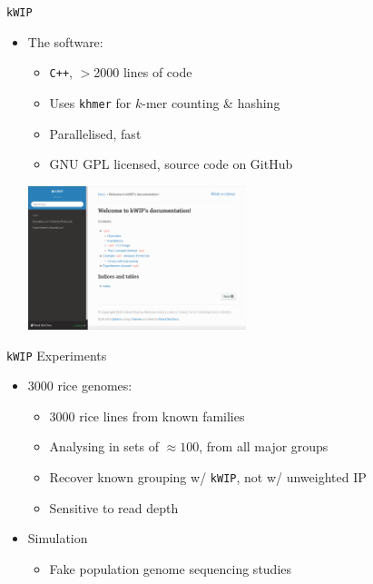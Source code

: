 \documentclass[t]{beamer}
\begin{document}
\begin{frame}{\texttt{kWIP}}
  \begin{itemize}
    \item The software:
      \begin{itemize}
        \item \texttt{C++}, $>$2000 lines of code
        \item Uses \texttt{khmer} for $k$-mer counting \& hashing
        \item Parallelised, fast
        \item GNU GPL licensed, source code on GitHub
      \end{itemize}
      \begin{center}
        \includegraphics[width=0.5\textwidth]{img/kwip-doc-screenshot.png}
      \end{center}
  \end{itemize}
\end{frame}

\begin{frame}{\texttt{kWIP} Experiments}
  \begin{itemize}
    \item 3000 rice genomes:
      \begin{itemize}
        \item 3000 rice lines from known families
        \item Analysing in sets of $\approx 100$, from all major groups
        \item Recover known grouping w/ \texttt{kWIP}, not w/ unweighted IP
        \item Sensitive to read depth
      \end{itemize}
    \item Simulation
      \begin{itemize}
        \item Fake population genome sequencing studies
      \end{itemize}
  \end{itemize}
\end{frame}
\end{document}
